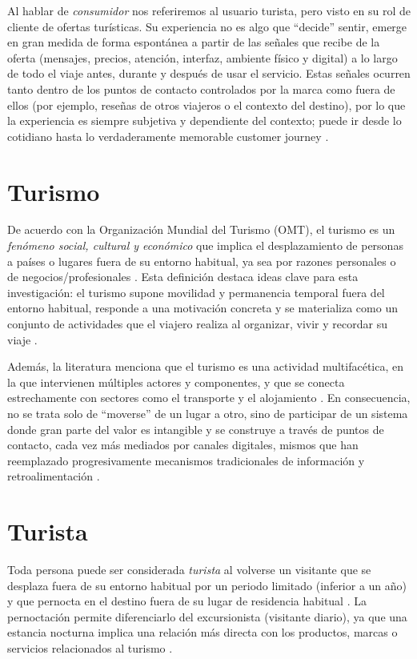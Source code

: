 Al hablar de \emph{consumidor} nos referiremos al usuario turista, pero visto en su rol de cliente de ofertas turísticas. Su experiencia no es algo que “decide” sentir, emerge en gran medida de forma espontánea a partir de las señales que recibe de la oferta (mensajes, precios, atención, interfaz, ambiente físico y digital) a lo largo de todo el viaje antes, durante y después de usar el servicio. Estas señales ocurren tanto dentro de los puntos de contacto controlados por la marca como fuera de ellos (por ejemplo, reseñas de otros viajeros o el contexto del destino), por lo que la experiencia es siempre subjetiva y dependiente del contexto; puede ir desde lo cotidiano hasta lo verdaderamente memorable customer journey \parencite{becker2020customer}.

\section{Turismo}
\label{sec:turismo}
De acuerdo con la Organización Mundial del Turismo (OMT), el turismo es un \textit{fenómeno social, cultural y económico} que implica el desplazamiento de personas a países o lugares fuera de su entorno habitual, ya sea por razones personales o de negocios/profesionales \parencite{unwto-glossary}. Esta definición destaca ideas clave para esta investigación: el turismo supone movilidad y permanencia temporal fuera del entorno habitual, responde a una motivación concreta y se materializa como un conjunto de actividades que el viajero realiza al organizar, vivir y recordar su viaje \parencite{rusu2023holistic,ortiz2024slr}.

Además, la literatura menciona que el turismo es una actividad multifacética, en la que intervienen múltiples actores y componentes, y que se conecta estrechamente con sectores como el transporte y el alojamiento \parencite{ortiz2024slr}. En consecuencia, no se trata solo de “moverse” de un lugar a otro, sino de participar de un sistema donde gran parte del valor es intangible y se construye a través de puntos de contacto, cada vez más mediados por canales digitales, mismos que han reemplazado progresivamente mecanismos tradicionales de información y retroalimentación \parencite{rusu2023holistic}.

\section{Turista}
\label{sec:turista}
Toda persona puede ser considerada \emph{turista} al volverse un visitante que se desplaza fuera de su entorno habitual por un periodo limitado (inferior a un año) y que pernocta en el destino fuera de su lugar de residencia habitual \parencite{ortiz2024slr,unwto-glossary}. La pernoctación permite diferenciarlo del excursionista (visitante diario), ya que una estancia nocturna implica una relación más directa con los productos, marcas o servicios relacionados al turismo \parencite{ortiz2024slr}.

